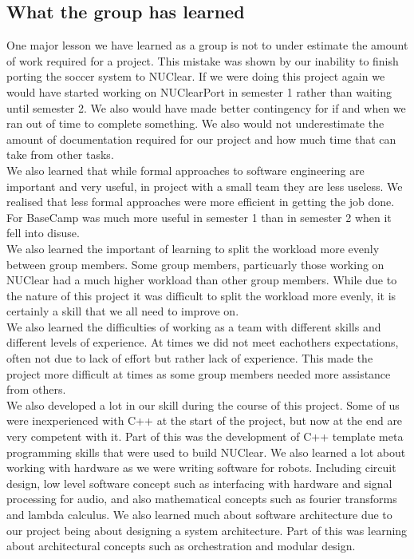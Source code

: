 \documentclass[english,12pt]{scrartcl}
\begin{document}
	\subsection{What the group has learned}
		One major lesson we have learned as a group is not to under estimate the amount of work required for a project.
		This mistake was shown by our inability to finish porting the soccer system to NUClear.
		If we were doing this project again we would have started working on NUClearPort in semester 1 rather than waiting until semester 2.
		We also would have made better contingency for if and when we ran out of time to complete something.
		We also would not underestimate the amount of documentation required for our project and how much time that can take from other tasks.
		\\
		We also learned that while formal approaches to software engineering are important and very useful, in project with a small team they are less useless.
		We realised that less formal approaches were more efficient in getting the job done.
		For BaseCamp was much more useful in semester 1 than in semester 2 when it fell into disuse.
		\\
		We also learned the important of learning to split the workload more evenly between group members.
		Some group members, particuarly those working on NUClear had a much higher workload than other group members.
		While due to the nature of this project it was difficult to split the workload more evenly, it is certainly a skill that we all need to improve on.
		\\
		We also learned the difficulties of working as a team with different skills and different levels of experience.
		At times we did not meet eachothers expectations, often not due to lack of effort but rather lack of experience.
		This made the project more difficult at times as some group members needed more assistance from others.
		\\
		We also developed a lot in our skill during the course of this project.
		Some of us were inexperienced with C++ at the start of the project, but now at the end are very competent with it.
		Part of this was the development of C++ template meta programming skills that were used to build NUClear.
		We also learned a lot about working with hardware as we were writing software for robots.
		Including circuit design, low level software concept such as interfacing with hardware and signal processing for audio, and also mathematical concepts such as fourier transforms and lambda calculus.
		We also learned much about software architecture due to our project being about designing a system architecture.
		Part of this was learning about architectural concepts such as orchestration and modular design.
		
		
\end{document}
